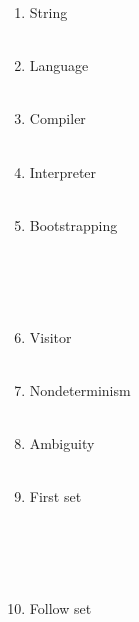 \documentclass[10pt]{amsart}
\begin{document}
\begin{enumerate}
\item String\hfill\underline{}\\\\ %
\item Language\hfill\underline{\hspace{4in}}\\\\ %
\item Compiler\hfill\underline{\hspace{4in}}\\\\ %
\item Interpreter\hfill\underline{\hspace{4in}}\\\\
\item Bootstrapping\hfill\underline{\hspace{4in}}\\\\\\\underline{\hspace{5.47in}}\\\\ %
\item Visitor\hfill\underline{\hspace{4in}}\\\\
\item Nondeterminism\hfill\underline{\hspace{4in}}\\\\
\item Ambiguity\hfill\underline{\hspace{4in}}\\\\
\item First set\hfill\underline{\hspace{4in}}\\\\\\\underline{\hspace{5.47in}}\\\\
\item Follow set\hfill\underline{\hspace{4in}}\\\\\\\underline{\hspace{5.47in}}
\end{enumerate}
\end{document}
